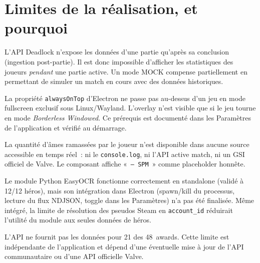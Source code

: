 \documentclass[12pt,a4paper]{article}
\begin{document}
\section{Limites de la réalisation, et pourquoi}

\begin{description}[leftmargin=2cm, style=nextline]
  \item[\normalfont\textbf{Roster en temps réel (Live Dashboard)}]
    L'API Deadlock n'expose les données d'une partie qu'après sa
    conclusion (ingestion post-partie). Il est donc impossible d'afficher
    les statistiques des joueurs \textit{pendant} une partie active. Un
    mode MOCK compense partiellement en permettant de simuler un match en
    cours avec des données historiques.

  \item[\normalfont\textbf{Overlay en mode fullscreen exclusif}]
    La propriété \texttt{alwaysOnTop} d'Electron ne passe pas au-dessus
    d'un jeu en mode fullscreen exclusif sous Linux/Wayland. L'overlay
    n'est visible que si le jeu tourne en mode \textit{Borderless
    Windowed}. Ce prérequis est documenté dans les Paramètres de
    l'application et vérifié au démarrage.

  \item[\normalfont\textbf{Composant Souls/min en overlay}]
    La quantité d'âmes ramassées par le joueur n'est disponible dans
    aucune source accessible en temps réel~: ni le \texttt{console.log},
    ni l'API active match, ni un GSI officiel de Valve. Le composant
    affiche «~\texttt{-- SPM}~» comme placeholder honnête.

  \item[\normalfont\textbf{OCR worker non intégré à Electron}]
    Le module Python EasyOCR fonctionne correctement en standalone
    (validé à 12/12 héros), mais son intégration dans Electron (spawn/kill
    du processus, lecture du flux NDJSON, toggle dans les Paramètres) n'a
    pas été finalisée. Même intégré, la limite de résolution des pseudos
    Steam en \texttt{account\_id} réduirait l'utilité du module aux seules
    données de héros.

  \item[\normalfont\textbf{21/48 awards indisponibles}]
    L'API ne fournit pas les données pour 21 des 48~awards. Cette limite
    est indépendante de l'application et dépend d'une éventuelle mise à
    jour de l'API communautaire ou d'une API officielle Valve.
\end{description}
\end{document}
